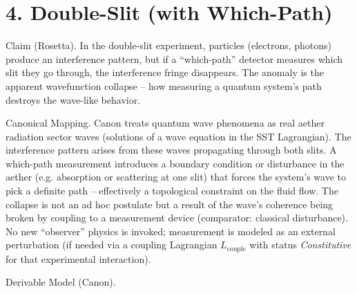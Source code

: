 \documentclass[11pt]{article}
\begin{document}
\section*{4. Double-Slit (with Which-Path)}

Claim (Rosetta). In the double-slit experiment, particles (electrons, photons) produce an interference pattern, but if a “which-path” detector measures which slit they go through, the interference fringe disappears. The anomaly is the apparent wavefunction collapse – how measuring a quantum system’s path destroys the wave-like behavior.


Canonical Mapping. Canon treats quantum wave phenomena as real aether radiation sector waves (solutions of a wave equation in the SST Lagrangian). The interference pattern arises from these waves propagating through both slits. A which-path measurement introduces a boundary condition or disturbance in the aether (e.g. absorption or scattering at one slit) that forces the system’s wave to pick a definite path – effectively a topological constraint on the fluid flow. The collapse is not an ad hoc postulate but a result of the wave’s coherence being broken by coupling to a measurement device (comparator: classical disturbance). No new “observer” physics is invoked; measurement is modeled as an external perturbation (if needed via a coupling Lagrangian $L_{\text{couple}}$ with status \textit{Constitutive} for that experimental interaction).


Derivable Model (Canon).
\end{document}
